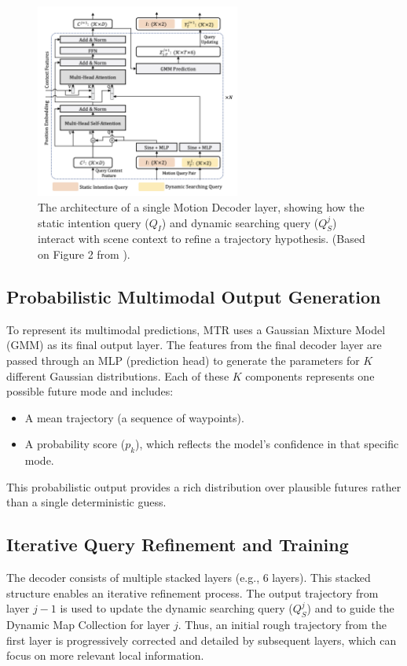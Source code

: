 \begin{figure}[htbp]
    \centering
    \includegraphics[width=0.6\textwidth]{figures/decoder_layer_detail.png}
    \caption{The architecture of a single Motion Decoder layer, showing how the static intention query ($Q_I$) and dynamic searching query ($Q_S^j$) interact with scene context to refine a trajectory hypothesis. (Based on Figure 2 from \cite{Shi2022MTR}).}
    \label{fig:decoder_layer}
\end{figure}

\subsection{Probabilistic Multimodal Output Generation}
To represent its multimodal predictions, MTR uses a Gaussian Mixture Model (GMM) as its final output layer. The features from the final decoder layer are passed through an MLP (prediction head) to generate the parameters for $K$ different Gaussian distributions. Each of these $K$ components represents one possible future mode and includes:
\begin{itemize}
    \item A mean trajectory (a sequence of waypoints).
    \item A probability score ($p_k$), which reflects the model's confidence in that specific mode.
\end{itemize}
This probabilistic output provides a rich distribution over plausible futures rather than a single deterministic guess.

\subsection{Iterative Query Refinement and Training}
The decoder consists of multiple stacked layers (e.g., 6 layers). This stacked structure enables an iterative refinement process. The output trajectory from layer $j-1$ is used to update the dynamic searching query ($Q_S^j$) and to guide the Dynamic Map Collection for layer $j$. Thus, an initial rough trajectory from the first layer is progressively corrected and detailed by subsequent layers, which can focus on more relevant local information.

